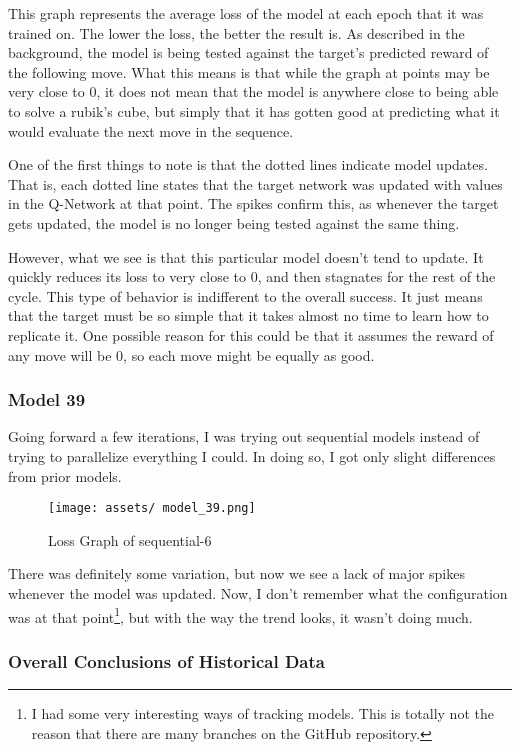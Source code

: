 \documentclass[12pt]{article}
\begin{document}
This graph represents the average loss of the model at each epoch that it was trained on. The lower the loss, the better the result is. As described in the background, the model is being tested against the target's predicted reward of the following move. What this means is that while the graph at points may be very close to $0$, it does not mean that the model is anywhere close to being able to solve a rubik's cube, but simply that it has gotten good at predicting what it would evaluate the next move in the sequence.

One of the first things to note is that the dotted lines indicate model updates. That is, each dotted line states that the target network was updated with values in the Q-Network at that point. The spikes confirm this, as whenever the target gets updated, the model is no longer being tested against the same thing.

However, what we see is that this particular model doesn't tend to update. It quickly reduces its loss to very close to 0, and then stagnates for the rest of the cycle. This type of behavior is indifferent to the overall success. It just means that the target must be so simple that it takes almost no time to learn how to replicate it. One possible reason for this could be that it assumes the reward of any move will be $0$, so each move might be equally as good.

\subsubsection{Model 39}

Going forward a few iterations, I was trying out sequential models instead of trying to parallelize everything I could. In doing so, I got only slight differences from prior models.

\begin{figure}[h]
	\centering
	\texttt{[image: assets/ model\_39.png]}
	\caption{Loss Graph of sequential-6}
\end{figure}


There was definitely some variation, but now we see a lack of major spikes whenever the model was updated. Now, I don't remember what the configuration was at that point\footnote{I had some very interesting ways of tracking models. This is totally not the reason that there are many branches on the GitHub repository.}, but with the way the trend looks, it wasn't doing much.

\subsubsection{Overall Conclusions of Historical Data}
\end{document}

